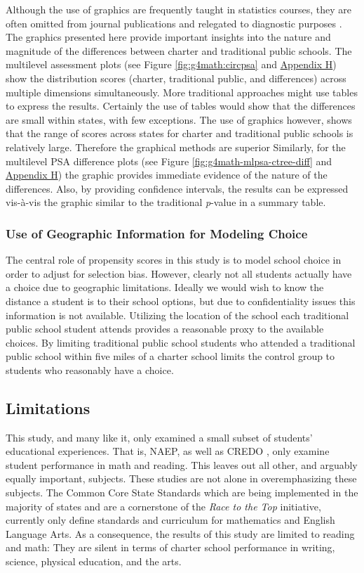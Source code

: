 \documentclass[letterpaper,12p,twoside]{article} %
\begin{document}
Although the use of graphics are frequently taught in statistics courses, they are often omitted from journal publications \cite{GelmanPasaricaDodhia2002} and relegated to diagnostic purposes \cite{Gelman2011}. The graphics presented here provide important insights into the nature and magnitude of the differences between charter and traditional public schools. The multilevel assessment plots (see Figure \ref{fig:g4math:circpsa} and \hyperref[appendixH]{Appendix H}) show the distribution scores (charter, traditional public, and differences) across multiple dimensions simultaneously. More traditional approaches might use tables to express the results. Certainly the use of tables would show that the differences are small within states, with few exceptions. The use of graphics however, shows that the range of scores across states for charter and traditional public schools is relatively large. Therefore the graphical methods are superior Similarly, for the multilevel PSA difference plots (see Figure \ref{fig:g4math-mlpsa-ctree-diff} and \hyperref[appendixH]{Appendix H}) the graphic provides immediate evidence of the nature of the differences. Also, by providing confidence intervals, the results can be expressed vis-\`{a}-vis the graphic similar to the traditional \textit{p}-value in a summary table.

\subsubsection{Use of Geographic Information for Modeling Choice}

The central role of propensity scores in this study is to model school choice in order to adjust for selection bias. However, clearly not all students actually have a choice due to geographic limitations. Ideally we would wish to know the distance a student is to their school options, but due to confidentiality issues this information is not available. Utilizing the location of the school each traditional public school student attends provides a reasonable proxy to the available choices. By limiting traditional public school students who attended a traditional public school within five miles of a charter school limits the control group to students who reasonably have a choice.

\subsection{Limitations}

This study, and many like it, only examined a small subset of students’ educational experiences. That is, NAEP, as well as CREDO \cite{credo,credo2013}, only examine student performance in math and reading. This leaves out all other, and arguably equally important, subjects. These studies are not alone in overemphasizing these subjects. The Common Core State Standards which are being implemented in the majority of states and are a cornerstone of the \textit{Race to the Top} initiative, currently only define standards and curriculum for mathematics and English Language Arts. As a consequence, the results of this study are limited to reading and math: They are silent in terms of charter school performance in writing, science, physical education, and the arts.
\end{document}
